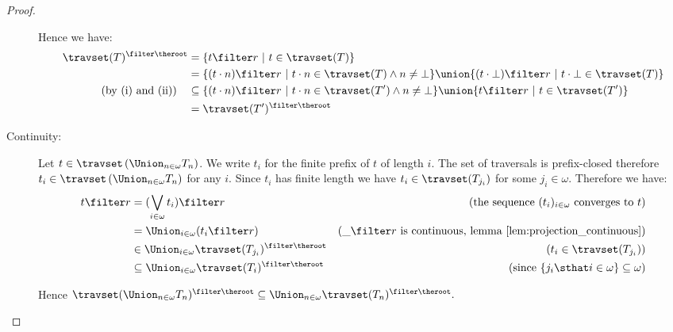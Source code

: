 \begin{proof}
\begin{description}
        Hence we have:
        \begin{align*}
        \travset(T)^{\filter \theroot} &= \{ t \filter r \ | \ t \in \travset(T)     \} \\
        & = \{ (t\cdot n) \filter r \ | \ t\cdot n \in \travset(T) \wedge n \neq \bot \}
            \union \{ (t \cdot \bot ) \filter r \ | \ t \cdot \bot \in \travset(T)  \} \\
\mbox{(by (i) and (ii))} \quad        & \subseteq  \{ (t\cdot n)
\filter r \ | \ t\cdot n \in \travset(T') \wedge n \neq \bot
\}
            \union \{ t \filter r \ | \ t \in \travset(T')  \} \\
        & = \travset(T')^{\filter \theroot}
        \end{align*}

        \item[Continuity:] Let $t \in \travset \left( \Union_{n\in\omega} T_n \right)$.
        We write $t_i$ for the finite prefix of $t$ of length $i$.
        The set of traversals is prefix-closed therefore $t_i \in \travset \left( \Union_{n\in\omega} T_n \right)$ for any $i$.
        Since $t_i$ has finite length we have $t_i \in \travset(T_{j_i})$ for some $j_i \in \omega$.
        Therefore we have:
        \begin{align*}
          t \filter r &= (\bigvee_{i\in\omega} t_i ) \filter r   & (\mbox{the sequence $(t_i)_{i\in\omega}$ converges to $t$}) \\
          &= \Union_{i\in\omega} ( t_i \filter r )   & (\_ \filter r \mbox{ is continuous, lemma \ref{lem:projection_continuous}}) \\
          &\in \Union_{i\in\omega} \travset(T_{j_i})^{\filter \theroot}   & (t_i \in \travset(T_{j_i})) \\
          &\subseteq \Union_{i\in\omega} \travset(T_i)^{\filter \theroot}   & (\mbox{since } \{ j_i \sthat i \in \omega \} \subseteq \omega)
        \end{align*}

        Hence $\travset(\Union_{n\in\omega} T_n )^{\filter
        \theroot} \subseteq \Union_{n\in\omega}
        \travset(T_n)^{\filter \theroot}.$

    \end{description}
\end{proof}

